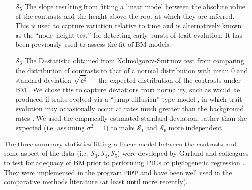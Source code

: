 \documentclass[a4paper,12pt]{article}
\begin{document}
\begin{enumerate}
\item[$\mathcal{S}_5$] The slope resulting from fitting a linear model between the absolute value of the contrasts and the height above the root at which they are inferred. This is used to capture variation relative to time and is alternatively known as the ``node--height test'' \citep{FreckletonHarvey2006, SlaterPennell} for detecting early bursts of trait evolution. It has been  previously used to assess the fit of BM models.

\item[$\mathcal{S}_6$] The D--statistic obtained from Kolmolgorov-Smirnov test from comparing the distribution of contrasts to that of a normal distribution with mean 0 and standard deviation $\sqrt{\overline{\mathbf{c}^2}}$ --- the expected distribution of the contrasts under BM \citep{Felsenstein1985, Rohlf2001}. We chose this to capture deviations from normality, such as would be produced if traits evolved via a ``jump diffusion'' type model \citep{Landis2012, Eastmanlevy}, in which trait evolution may occasionally occur at rates much greater than the background rates \citep[see][]{PennellPE}. We used the empirically estimated standard deviation, rather than the expected (i.e. assuming $\sigma^2=1$) to make $\mathcal{S}_1$ and $\mathcal{S}_6$ more independent.

\end{enumerate}

The three summary statistics fitting a linear model between the contrasts and some aspect of the data (i.e. $\mathcal{S}_3, \mathcal{S}_4, \mathcal{S}_5$) were developed by Garland and colleagues \citep{Garland1992, Garland1993,  Diaz1996} to test for adequacy of BM prior to performing PICs \citep{Felsenstein1985} or phylogenetic regression \citep{Grafen1989}. They were implemented in the program \texttt{PDAP} \citep{Garland1993, Midford2005} and have been well used in the comparative methods literature (at least until more recently).
\end{document}
